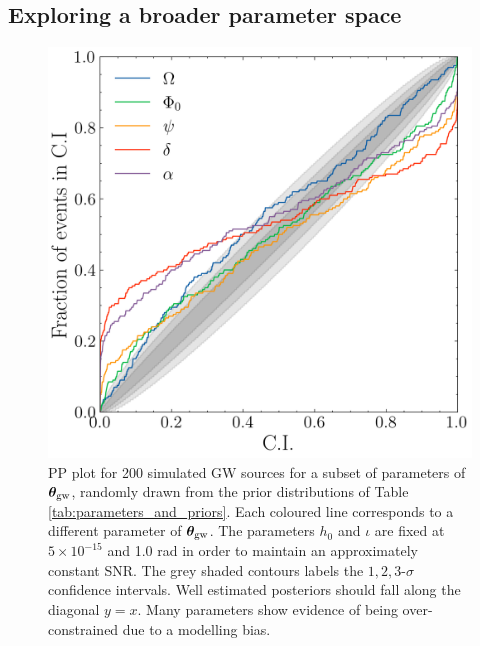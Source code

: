 \documentclass[fleqn,usenatbib,useAMS]{mnras}
\begin{document}
\subsection{Exploring a broader parameter space} \label{sec:parameter_space}
\begin{figure}
	\centering
	\includegraphics[width=\columnwidth]{images/pp_plot_new}
	\caption{PP plot for 200 simulated GW sources for a subset of parameters of $\boldsymbol{\theta}_{\rm gw}$, randomly drawn from the prior distributions of Table \ref{tab:parameters_and_priors}. Each coloured line corresponds to a different parameter of $\boldsymbol{\theta}_{\rm gw}$. The parameters $h_0$ and $\iota$ are fixed at $5 \times 10^{-15}$ and 1.0 rad in order to maintain an approximately constant SNR. The grey shaded contours labels the $1,2,3$-$\sigma$ confidence intervals. Well estimated posteriors should fall along the diagonal $y=x$. Many parameters show evidence of being over-constrained due to a modelling bias. }
	\label{fig:parameter_space}
\end{figure}
\end{document}
